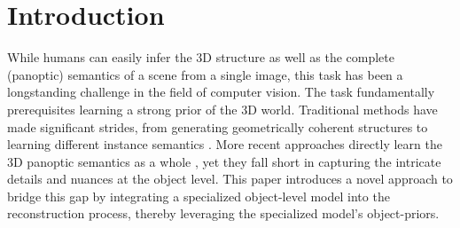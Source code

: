 \section{Introduction}
\label{sec:intro}


While humans can easily infer the 3D structure as well as the complete (panoptic) semantics of a scene from a single image, this task has been a longstanding
challenge in the field of computer vision. The task fundamentally prerequisites learning a strong prior of the 3D world. Traditional methods have made significant strides,
from generating geometrically coherent structures \citep{denninger20203d, shin20193d} to learning different instance semantics \citep{gkioxari2019mesh, kuo2020mask2cad,
nie2020total3dunderstanding}. More recent approaches directly learn the 3D panoptic semantics as a whole \citep{dahnert2021panoptic, zhang2023uni}, yet they fall short in capturing the intricate details and nuances at the object level.
This paper introduces a novel approach to bridge this gap by integrating a specialized object-level model into the reconstruction process, thereby leveraging the specialized model's object-priors.
